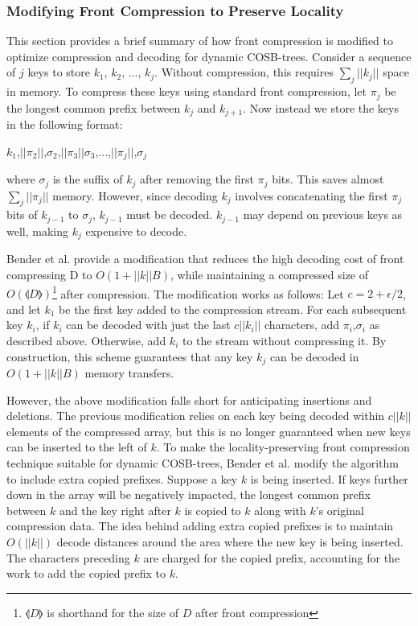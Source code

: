 \documentclass{style}
\begin{document}
\subsubsection{Modifying Front Compression to Preserve Locality}

This section provides a brief summary of how front compression is modified to
optimize compression and decoding for dynamic COSB-trees. Consider a sequence of $j$ keys to store $k_{1}$, $k_{2}$,
..., $k_{j}$. Without compression, this requires $\sum_{j}||k_{j}||$ space in
memory. To compress these keys using standard front compression, let $\pi_{j}$ be the
longest common prefix between $k_{j}$ and $k_{j+1}$. Now instead we store the
keys in the following format:

\begin{center}
$k_{1}$,$||\pi_{2}||$,$\sigma_{2}$,$||\pi_{3}||$$\sigma_{3}$,...,$||\pi_{j}||$,$\sigma_{j}$
\end{center} 

where $\sigma_{j}$ is the suffix of $k_{j}$ after removing the first $\pi_{j}$
bits. This saves almost $\sum_{j}||\pi_{j}||$ memory. However, since decoding
$k_{j}$ involves concatenating the first $\pi_{j}$ bits of $k_{j-1}$ to
$\sigma_{j}$, $k_{j-1}$ must be decoded. $k_{j-1}$ may depend on previous keys
as well, making $k_{j}$ expensive to decode.

Bender et al. provide a modification that reduces the high decoding cost of front compressing D to $O(1+||k||B)$, while maintaining a compressed size of $O(\llangle{D}\rrangle{})$\footnote{$\llangle{D}\rrangle{}$ is shorthand for the size of $D$ after front compression} after compression. The modification works as follows: Let $c = 2 + \epsilon/2$, and let $k_{1}$ be
the first key added to the compression stream. For each subsequent key
$k_{i}$, if $k_{i}$ can be decoded with just the last $c||k_{i}||$ characters,
add $\pi_{i}$,$\sigma_{i}$ as described above. Otherwise, add $k_{i}$ to the stream without compressing it. By construction, this scheme guarantees that any key $k_{j}$ can be decoded in $O(1+||k||B)$ memory transfers.

However, the above modification falls short for anticipating insertions and
deletions. The previous modification relies on each key being decoded within
$c||k||$ elements of the compressed array, but this is no longer
guaranteed when new keys can be inserted to the left of $k$. To make the
locality-preserving front compression technique suitable for dynamic
COSB-trees, Bender et al. modify the algorithm to include extra copied
prefixes. Suppose a key $k$ is being inserted. If keys further down in the array will be negatively impacted, the longest common prefix between $k$ and the key right after $k$ is copied to $k$ along with $k$'s original compression data. The idea behind adding extra copied prefixes is to maintain $O(||k||)$ decode distances around the area where the new key is being inserted. The characters preceding $k$ are charged for the copied prefix, accounting for the work to add the copied prefix to $k$.
\end{document}
